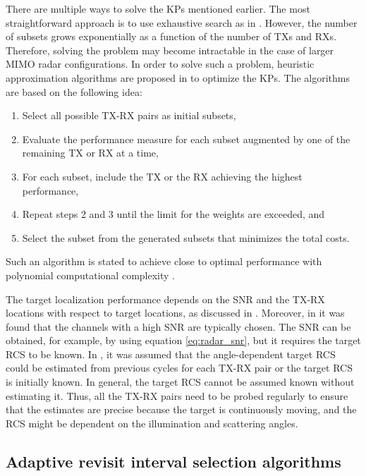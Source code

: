 \documentclass[english, 12pt, a4paper, elec, utf8, a-1b, online]{aaltothesis}
\numberwithin{equation}{section}
\begin{document}
There are multiple ways to solve the KPs mentioned earlier.
The most straightforward approach is to use exhaustive search as in \cite{Sun2014}.
However, the number of subsets grows exponentially as a function of the number of TXs and RXs.
Therefore, solving the problem may become intractable in the case of larger MIMO radar configurations.
In order to solve such a problem, heuristic approximation algorithms are proposed in \cite{Godrich2011a, Godrich2011} to optimize the KPs.
The algorithms are based on the following idea:
\begin{enumerate}
    \item Select all possible TX-RX pairs as initial subsets,
    \item Evaluate the performance measure for each subset augmented by one of the remaining TX or RX at a time, 
    \item For each subset, include the TX or the RX achieving the highest performance,
    \item Repeat steps 2 and 3 until the limit for the weights are exceeded, and
    \item Select the subset from the generated subsets that minimizes the total costs. 
\end{enumerate}
Such an algorithm is stated to achieve close to optimal performance with polynomial computational complexity \cite{Godrich2011a, Godrich2011}.

The target localization performance depends on the SNR and the TX-RX locations with respect to target locations, as discussed in \cite{Sun2014}.
Moreover, in \cite{Sun2014} it was found that the channels with a high SNR are typically chosen.
The SNR can be obtained, for example, by using equation \eqref{eq:radar_snr}, but it requires the target RCS to be known.
In \cite{Godrich2011a, Godrich2011, Sun2014}, it was assumed that the angle-dependent target RCS could be estimated from previous cycles for each TX-RX pair or the target RCS is initially known.
In general, the target RCS cannot be assumed known without estimating it. 
Thus, all the TX-RX pairs need to be probed regularly to ensure that the estimates are precise because the target is continuously moving, and the RCS might be dependent on the illumination and scattering angles.


\subsection{Adaptive revisit interval selection algorithms} \label{sec:tbm_ri}
\end{document}

